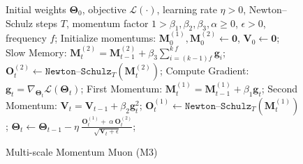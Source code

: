 {\begin{figure}
\vspace*{-11ex}
    \begin{minipage}{0.45\textwidth}
        \begin{algorithm}[H]
            \caption{Multi-scale Momentum Muon (M3) }\label{alg:M3}
            \begin{algorithmic}[1]
            \Require Initial weights $\boldsymbol{\Theta}_0$, objective $\mathcal{L}(\cdot)$, learning rate $\eta > 0$, Newton–Schulz steps $T$, momentum factor $1 > \beta_1, \beta_2, \beta_3, \alpha \geq 0$, $\epsilon>0$, frequency $f$; 
            \State Initialize momentums: $\boldsymbol{M}^{(1)}_{0}, \boldsymbol{M}^{(2)}_{0}  \leftarrow \mathbf{0}$, $\boldsymbol{V}_{0} \leftarrow \mathbf{0}$;
                \State Slow Memory: $\boldsymbol{M}^{(2)}_{t} = \boldsymbol{M}^{(2)}_{t-1} + \beta_3 \sum_{i = (k-1)f}^{k\:f} \boldsymbol{g}_i$; 
                \State $\boldsymbol{O}^{(2)}_t \leftarrow \texttt{Newton–Schulz}_{T}\left( \boldsymbol{M}^{(2)}_{t}\right)$;
                    \State Compute Gradient: $\boldsymbol{g}_t = \nabla_{\boldsymbol{\Theta}_t} \mathcal{L}(\boldsymbol{\Theta}_t)$;
                    \State First Momentum: $\boldsymbol{M}^{(1)}_{t} = \boldsymbol{M}^{(1)}_{t-1} + \beta_1 \boldsymbol{g}_t$;
                    \State Second Momentum: $\boldsymbol{V}_{t} = \boldsymbol{V}_{t-1} + \beta_2 \boldsymbol{g}^{2}_t$;
                    \State $\boldsymbol{O}^{(1)}_t \leftarrow \texttt{Newton–Schulz}_{T}\left( \boldsymbol{M}^{(1)}_{t}\right)$;
                    \State $\boldsymbol{\Theta}_t \leftarrow \boldsymbol{\Theta}_{t-1} - \eta \: \frac{\boldsymbol{O}^{(1)}_t + \:\alpha \:\boldsymbol{O}^{(2)}_t}{\sqrt{ \boldsymbol{V}_{t}+ \epsilon}}$;
                \EndFor
            \EndFor
            \end{algorithmic}
        \end{algorithm}
    \end{minipage}
    \vspace{-4ex}
\end{figure}

}
